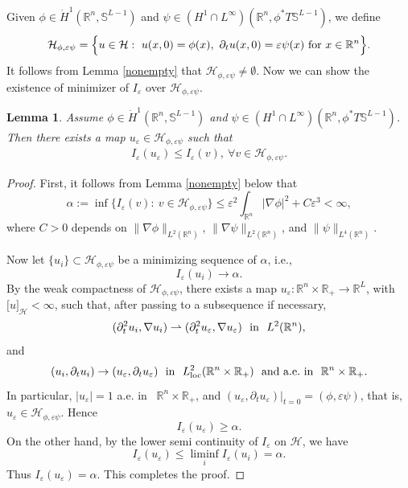 \documentclass[12pt,twoside,reqno]{amsart}
\newtheorem{lemma}[theorem]{Lemma}
\theoremstyle{definition}              %
\theoremstyle{remark}                  %
\newcommand{\R}{\mathbb{R}}                 %
\newcommand{\eps}{\varepsilon}
\renewcommand{\1}{\mathbbm{1}}                                      %
\numberwithin{equation}{section}
\numberwithin{definition}{section}
\numberwithin{theorem}{section}
\numberwithin{remark}{section}
\begin{document}
\smallskip
Given $\phi\in \dot{H}^1(\mathbb R^n,\mathbb S^{L-1})$ 
and $\psi\in ({H}^1\cap L^\infty)(\mathbb R^n,\mathbb \phi^*T\mathbb{S}^{L-1})$, we define
\[
\mathcal{H}_{\phi,\eps\psi}
=\Big\{u\in \mathcal{H}: \ u(x,0)=\phi(x),
\ \partial_t u(x,0)=\eps\psi(x)\ {\rm{for}}\ x\in \R^n\Big\}.
\]
It follows from Lemma \ref{nonempty} that
$\mathcal{H}_{\phi,\eps\psi}\not=\emptyset$.
Now we can show the 
existence of minimizer of $I_\eps$ over $\mathcal{H}_{\phi,\eps\psi}$.
\begin{lemma} \label{existenemin} Assume $\phi\in \dot{H}^1(\mathbb R^n,\mathbb S^{L-1})$ 
and $\psi\in ({H}^1\cap L^\infty)(\mathbb R^n,\mathbb \phi^*T\mathbb{S}^{L-1})$. Then there exists a map $u_\eps\in\mathcal{H}_{\phi,\eps\psi}$ such that
\begin{align}\label{minimizer}
I_\eps(u_\eps)\le I_\eps(v), \ \forall v\in\mathcal{H}_{\phi,\eps\psi}. \end{align}
\end{lemma}
\begin{proof} First, it follows from Lemma \ref{nonempty} below that
\[
\alpha:=\inf\Big\{I_\eps(v): 
\ v\in\mathcal{H}_{\phi,\eps\psi}\Big\}
\le \eps^2\int_{\mathbb R^n}|\nabla\phi|^2+C\eps^3<\infty,
\]
where $C>0$ depends on 
$\|\nabla\phi\|_{L^2(\mathbb{R}^n)}$,
$\|\nabla\psi\|_{L^2(\mathbb{R}^n)}$,
and $\|\psi\|_{L^4(\mathbb{R}^n)}$.

Now let $\{u_i\}\subset\mathcal{H}_{\phi,\eps\psi}$ be a minimizing sequence of $\alpha$, i.e.,
$$
I_\eps(u_i)\rightarrow \alpha.
$$
By the weak compactness of $\mathcal{H}_{\phi,\eps\psi}$, there exists a map $u_\eps:\R^n\times\mathbb R_+\to\mathbb R^L$,
with $\big[u\big]_{\mathcal{H}}<\infty$,
such that, after passing to a subsequence if necessary,
$$
(\partial_t^2u_i,\nabla u_i)\rightharpoonup
(\partial_t^2u_\eps,\nabla u_\eps) 
\ \ {\rm{in}}\ \ L^2(\mathbb R^n),
$$
and
$$
(u_i,\partial_tu_i)\rightarrow (u_\eps, \partial_tu_\eps)
\ \ {\rm{in}}\ \ L^2_{\rm{loc}}(\mathbb{R}^n\times \R_+)\ \ {\rm{and\ a.e.\ in }}
\ \ \R^n\times\mathbb R_+.
$$
In particular, $|u_\eps|=1$ a.e. in 
\ $\R^n\times\mathbb R_+$, and $(u_\eps,\partial_t u_\eps)\big|_{t=0}=(\phi,\eps\psi)$, that is, $u_\eps\in \mathcal{H}_{\phi,\eps\psi}$. 
Hence 
\[
I_\eps(u_\eps)\ge\alpha.
\]
On the other hand, by the lower semi continuity of $I_\eps$
on $\mathcal{H}$, we have
\[
I_\eps(u_\eps)\le \liminf_{i}I_\eps(u_i)=\alpha.
\]
Thus $I_\eps(u_\eps)=\alpha$. This
completes the proof.
\end{proof}
\end{document}
